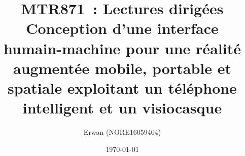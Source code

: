 \documentclass[letterpaper,twoside,12pt]{article}
\title{
	MTR871~: Lectures dirigées \\
	\large Conception d'une interface humain-machine pour une réalité augmentée mobile, portable et spatiale exploitant un téléphone intelligent et un visiocasque}
\author{Erwan \bsc{Normand} (NORE16059404)}
\date{\today}
\begin{document}
	
	\maketitle
	
	\begin{spacing}{1.5}
		
	\end{spacing}

	\newpage
	
	
\end{document}

